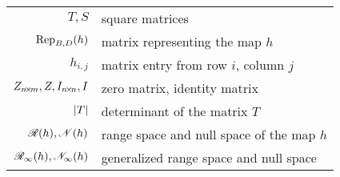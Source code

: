 \begin{center}
\begin{tabular}{r|l}
    \( T,S \)              &square matrices                           \\
    \( \rep{h}{B,D} \)     &matrix representing the map \( h \)       \\
    \( h_{i,j} \)          &matrix entry from row \( i \),
                              column \( j \)                      \\
    \( Z_{\nbym{n}{m}},Z,I_{\nbyn{n}},I \)        &zero matrix, identity matrix    \\
    \( \deter{T} \)        &determinant of the matrix \( T \)         \\
    \( \rangespace{h},\nullspace{h} \)
                           &range space and null space of the map \( h \) \\
    \( \genrangespace{h},\gennullspace{h} \)
                           &generalized range space and null space
  \end{tabular}
\end{center}\vfill

